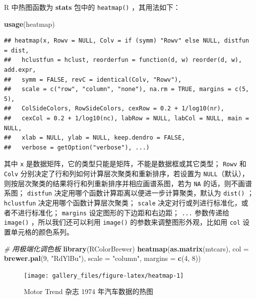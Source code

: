 \documentclass[
  b5paper,
  UTF8,twoside]{book}
\newenvironment{Shaded}{\begin{snugshade}}{\end{snugshade}}
\newcommand{\AttributeTok}[1]{\textcolor[rgb]{0.13,0.29,0.53}{#1}}
\newcommand{\CommentTok}[1]{\textcolor[rgb]{0.56,0.35,0.01}{\textit{#1}}}
\newcommand{\DecValTok}[1]{\textcolor[rgb]{0.00,0.00,0.81}{#1}}
\newcommand{\FunctionTok}[1]{\textcolor[rgb]{0.13,0.29,0.53}{\textbf{#1}}}
\newcommand{\NormalTok}[1]{#1}
\newcommand{\StringTok}[1]{\textcolor[rgb]{0.31,0.60,0.02}{#1}}
\begin{document}
R 中热图函数为 \textbf{stats} 包中的 \texttt{heatmap()} ，其用法如下：

\begin{Shaded}
\begin{Highlighting}[]
\FunctionTok{usage}\NormalTok{(heatmap)}
\end{Highlighting}
\end{Shaded}

\begin{verbatim}
## heatmap(x, Rowv = NULL, Colv = if (symm) "Rowv" else NULL, distfun = dist,
##   hclustfun = hclust, reorderfun = function(d, w) reorder(d, w), add.expr,
##   symm = FALSE, revC = identical(Colv, "Rowv"),
##   scale = c("row", "column", "none"), na.rm = TRUE, margins = c(5, 5),
##   ColSideColors, RowSideColors, cexRow = 0.2 + 1/log10(nr),
##   cexCol = 0.2 + 1/log10(nc), labRow = NULL, labCol = NULL, main = NULL,
##   xlab = NULL, ylab = NULL, keep.dendro = FALSE,
##   verbose = getOption("verbose"), ...)
\end{verbatim}

其中 \texttt{x} 是数据矩阵，它的类型只能是矩阵，不能是数据框或其它类型； \texttt{Rowv} 和 \texttt{Colv} 分别决定了行和列如何计算层次聚类和重新排序，若设置为 \texttt{NULL}（默认），则按层次聚类的结果将行和列重新排序并相应画谱系图，若为 \texttt{NA} 的话，则不画谱系图； \texttt{distfun} 决定用哪个函数计算距离以便进一步计算聚类，默认为 \texttt{dist()} ； \texttt{hclustfun} 决定用哪个函数计算层次聚类； \texttt{scale} 决定对行或列进行标准化，或者不进行标准化； \texttt{margins} 设定图形的下边距和右边距； \texttt{...} 参数传递给 \texttt{image()} ，所以我们还可以利用 \texttt{image()} 的参数来调整图形外观，比如用 \texttt{col} 设置单元格的颜色系列。





\begin{Shaded}
\begin{Highlighting}[]
\CommentTok{\# 用极端化调色板}
\FunctionTok{library}\NormalTok{(RColorBrewer)}
\FunctionTok{heatmap}\NormalTok{(}\FunctionTok{as.matrix}\NormalTok{(mtcars), }\AttributeTok{col =} \FunctionTok{brewer.pal}\NormalTok{(}\DecValTok{9}\NormalTok{, }\StringTok{"RdYlBu"}\NormalTok{), }
        \AttributeTok{scale =} \StringTok{"column"}\NormalTok{, }\AttributeTok{margins =} \FunctionTok{c}\NormalTok{(}\DecValTok{4}\NormalTok{, }\DecValTok{8}\NormalTok{))}
\end{Highlighting}
\end{Shaded}

\begin{figure}

{\centering \texttt{[image: gallery\_files/figure-latex/heatmap-1]} 

}

\caption[汽车数据的热图]{Motor Trend 杂志 1974 年汽车数据的热图}\label{fig:heatmap}
\end{figure}
\end{document}
